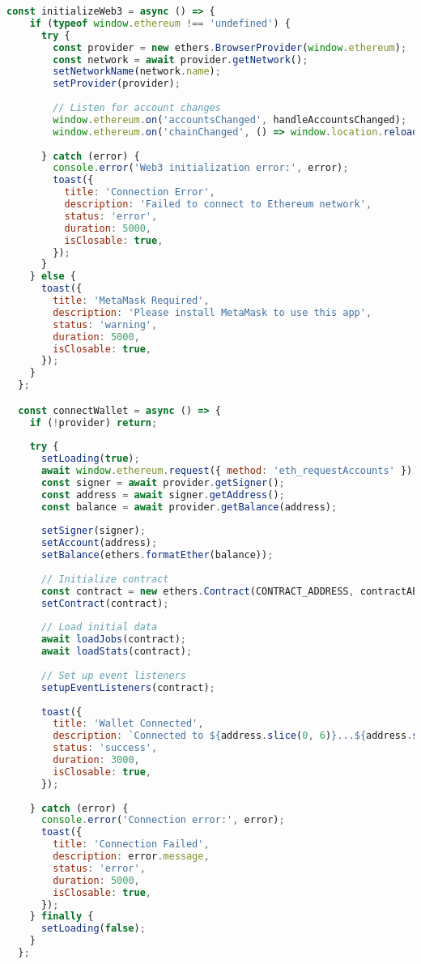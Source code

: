\begin{lstlisting}[language=JavaScript,caption={App.jsx - Main React Application}]
  const initializeWeb3 = async () => {
    if (typeof window.ethereum !== 'undefined') {
      try {
        const provider = new ethers.BrowserProvider(window.ethereum);
        const network = await provider.getNetwork();
        setNetworkName(network.name);
        setProvider(provider);
        
        // Listen for account changes
        window.ethereum.on('accountsChanged', handleAccountsChanged);
        window.ethereum.on('chainChanged', () => window.location.reload());
        
      } catch (error) {
        console.error('Web3 initialization error:', error);
        toast({
          title: 'Connection Error',
          description: 'Failed to connect to Ethereum network',
          status: 'error',
          duration: 5000,
          isClosable: true,
        });
      }
    } else {
      toast({
        title: 'MetaMask Required',
        description: 'Please install MetaMask to use this app',
        status: 'warning',
        duration: 5000,
        isClosable: true,
      });
    }
  };

  const connectWallet = async () => {
    if (!provider) return;
    
    try {
      setLoading(true);
      await window.ethereum.request({ method: 'eth_requestAccounts' });
      const signer = await provider.getSigner();
      const address = await signer.getAddress();
      const balance = await provider.getBalance(address);
      
      setSigner(signer);
      setAccount(address);
      setBalance(ethers.formatEther(balance));
      
      // Initialize contract
      const contract = new ethers.Contract(CONTRACT_ADDRESS, contractABI.abi, signer);
      setContract(contract);
      
      // Load initial data
      await loadJobs(contract);
      await loadStats(contract);
      
      // Set up event listeners
      setupEventListeners(contract);
      
      toast({
        title: 'Wallet Connected',
        description: `Connected to ${address.slice(0, 6)}...${address.slice(-4)}`,
        status: 'success',
        duration: 3000,
        isClosable: true,
      });
      
    } catch (error) {
      console.error('Connection error:', error);
      toast({
        title: 'Connection Failed',
        description: error.message,
        status: 'error',
        duration: 5000,
        isClosable: true,
      });
    } finally {
      setLoading(false);
    }
  };


\end{lstlisting}
